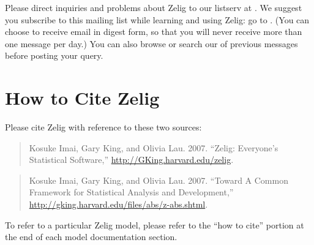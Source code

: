 Please direct inquiries and problems about Zelig to our listserv at
.  We
suggest you subscribe to this mailing list while learning and using
Zelig: go to .  (You can choose to receive email
in digest form, so that you will never receive more than one message
per day.)  You can also browse or search our
 of
previous messages before posting your query.

\section{How to Cite Zelig}

Please cite Zelig with reference to these two sources:
\begin{quote}
  Kosuke Imai, Gary King, and Olivia Lau. 2007. ``Zelig: Everyone's
  Statistical Software,'' \url{http://GKing.harvard.edu/zelig}.
\end{quote}
\begin{quote}
  Kosuke Imai, Gary King, and Olivia Lau. 2007. ``Toward A Common
  Framework for Statistical Analysis and Development,''
  \url{http://gking.harvard.edu/files/abs/z-abs.shtml}.
\end{quote}

To refer to a particular Zelig model, please refer to the ``how to
cite'' portion at the end of each model documentation section.

